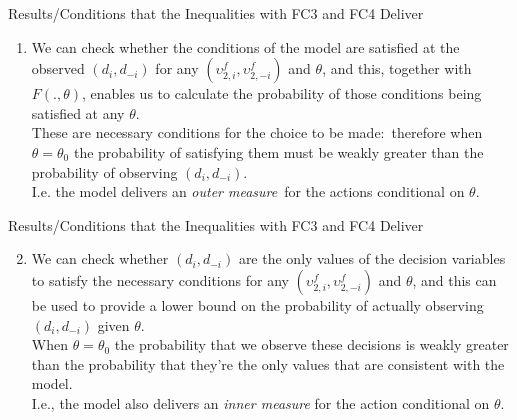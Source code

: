 \begin{frame}{\normalsize Results/Conditions that the Inequalities with FC3 and FC4 Deliver}

\begin{enumerate}
\item We can check whether the conditions of the model are satisfied at the
observed $(d_{i},d_{-i})$ for any $(\upsilon _{2,i}^{f},\upsilon
_{2,-i}^{f}) $ and $\theta $, and this, together with $F(.,\theta )$,
enables us to calculate the probability of those conditions being satisfied
at any $\theta $. \\
\vspace{0.2 in} 
These are necessary conditions for the choice to be made:\
therefore when $\theta =\theta _{0}$ the probability of satisfying them must
be weakly greater than the probability of observing $(d_{i},d_{-i})$. \\
\vspace{0.2 in} 
I.e. the model delivers an \textit{outer measure}\ for the actions conditional on $%
\theta $.
\end{enumerate}
\end{frame}

\begin{frame}{\normalsize Results/Conditions that the Inequalities with FC3 and FC4 Deliver}
\begin{enumerate}
\setcounter{enumi}{1}
\item We can check whether $(d_{i},d_{-i})$ are the only values of the
decision variables to satisfy the necessary conditions for any $(\upsilon
_{2,i}^{f},\upsilon _{2,-i}^{f})$ and $\theta $, and this can be used to
provide a lower bound on the probability of actually observing $%
(d_{i},d_{-i})$ given $\theta $. \\
\vspace{0.2in}
When $\theta =\theta _{0}$ the probability
that we observe these decisions is weakly greater than the probability that
they're the only values that are consistent with the model. \\
\vspace{0.2 in} 
I.e., the model also delivers an \textit{inner measure} for the action conditional on $\theta $.
\end{enumerate}
\end{frame}

